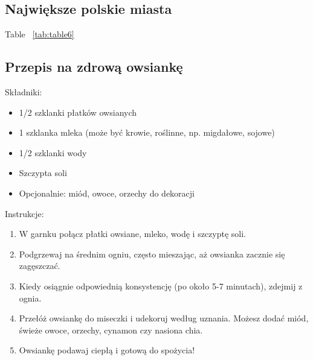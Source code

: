 \subsection{Największe polskie miasta}
\vspace{0,5cm}


\vspace{0,5cm}
Table ~\ref{tab:table6} 
\vspace{0,5cm}

\subsection{Przepis na zdrową owsiankę}
\vspace{0,5cm}
Składniki:
    \begin{itemize}
        \item 1/2 szklanki płatków owsianych
        \item 1 szklanka mleka (może być krowie, roślinne, np. migdałowe, sojowe)
        \item 1/2 szklanki wody
        \item Szczypta soli
        \item Opcjonalnie: miód, owoce, orzechy do dekoracji
    \end{itemize}
\vspace{0,5cm}

Instrukcje:
\begin{enumerate}
    \item W garnku połącz płatki owsiane, mleko, wodę i szczyptę soli.
    \item Podgrzewaj na średnim ogniu, często mieszając, aż owsianka zacznie się zagęszczać.
    \item Kiedy osiągnie odpowiednią konsystencję (po około 5-7 minutach), zdejmij z ognia.
    \item Przełóż owsiankę do miseczki i udekoruj według uznania. Możesz dodać miód, świeże owoce, orzechy, cynamon czy nasiona chia.
    \item Owsiankę podawaj ciepłą i gotową do spożycia!
\end{enumerate}
\vspace{0.5cm}



